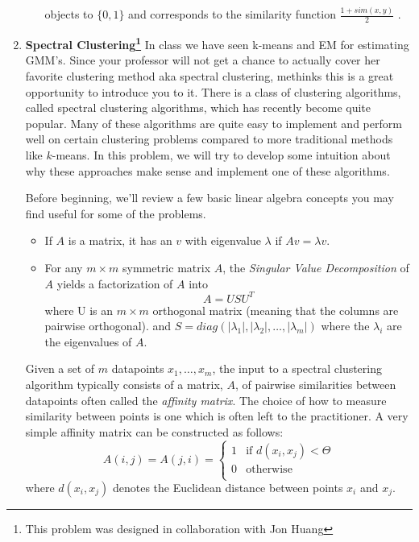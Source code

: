 \documentclass[11pt]{article}
\begin{document}
\begin{enumerate}
\begin{enumerate}
objects to $\{0, 1\}$ and corresponds to the similarity function $\frac{1+sim(x,y)}{2}$ .
\end{enumerate} 
\item \textbf{Spectral Clustering\footnote{This problem was designed in collaboration with Jon Huang}}
In class we have seen k-means and EM for estimating GMM's. Since your professor will not get a chance to actually cover her favorite clustering method aka spectral clustering, methinks this is a great opportunity to introduce you to it.
There is a class of clustering algorithms, called 
spectral clustering algorithms, which has recently 
become quite popular.  Many of these algorithms are 
quite easy to implement and perform well on 
certain clustering problems compared to more traditional 
methods like $k$-means.  In this problem, we will try to 
develop some intuition about why these approaches
make sense and implement one of these algorithms.

Before beginning, we'll review a few basic linear
algebra concepts you may find useful for some
of the problems.
\begin{itemize}
\item If $A$ is a matrix, it has an 
$v$ with eigenvalue $\lambda$ if $Av=\lambda v$.
\item For any $m\times m$ symmetric matrix $A$, 
the \emph{Singular Value Decomposition} of $A$ yields a 
factorization of $A$ into
\[
A = USU^T
\]
where U is an $m\times m$ orthogonal matrix 
(meaning that the columns are pairwise orthogonal).
and $S=diag(|\lambda_1|,|\lambda_2|,\dots,|\lambda_m|)$ 
where the $\lambda_i$ are the eigenvalues of $A$. 
\end{itemize}

Given a set of $m$ datapoints $x_1,\dots,x_m$,
the input to a spectral clustering algorithm typically
consists of a matrix, $A$, of pairwise similarities between
datapoints often called the \emph{affinity matrix}.  The choice of
how to measure similarity between points is one which is often left 
to the practitioner.  A very simple affinity matrix can be
constructed as follows:
\begin{equation}
\label{aff-eqn}
A(i,j)=A(j,i)=\left\{ \begin{array}{cc} 1 & \mbox{if $d(x_i,x_j)<\Theta$} \\
0 & \mbox{otherwise} \\
\end{array}\right.
\end{equation}
where $d(x_i,x_j)$ denotes the Euclidean distance 
between points $x_i$ and $x_j$.


\end{enumerate}
\end{document}
